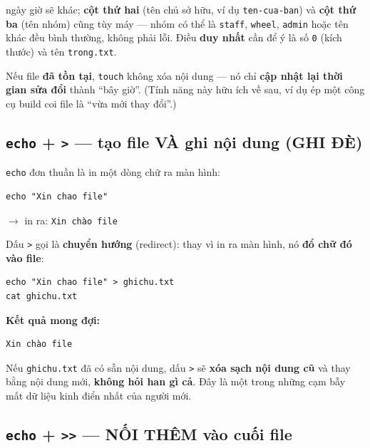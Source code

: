 \documentclass[12pt,a4paper]{article}
\newcommand{\cmd}[1]{\texttt{#1}}
\begin{document}
\begin{notebox}[title={Ghi chú: Máy bạn có thể hiển thị khác}]
ngày giờ sẽ khác; \textbf{cột thứ hai} (tên chủ sở hữu, ví dụ \cmd{ten-cua-ban}) và \textbf{cột thứ ba} (tên nhóm) cũng tùy máy --- nhóm có thể là \cmd{staff}, \cmd{wheel}, \cmd{admin} hoặc tên khác đều bình thường, không phải lỗi. Điều \textbf{duy nhất} cần để ý là số \cmd{0} (kích thước) và tên \cmd{trong.txt}.
\end{notebox}

Nếu file \textbf{đã tồn tại}, \cmd{touch} không xóa nội dung --- nó chỉ \textbf{cập nhật lại thời gian sửa đổi} thành ``bây giờ''. (Tính năng này hữu ích về sau, ví dụ ép một công cụ build coi file là ``vừa mới thay đổi''.)

\subsection{\texttt{echo} + \texttt{>} --- tạo file VÀ ghi nội dung (GHI ĐÈ)}

\cmd{echo} đơn thuần là in một dòng chữ ra màn hình:

\begin{Verbatim}
echo "Xin chao file"
\end{Verbatim}
$\rightarrow$ in ra: \cmd{Xin chào file}

Dấu \cmd{>} gọi là \textbf{chuyển hướng} (redirect): thay vì in ra màn hình, nó \textbf{đổ chữ đó vào file}:

\begin{Verbatim}
echo "Xin chao file" > ghichu.txt
cat ghichu.txt
\end{Verbatim}

\textbf{Kết quả mong đợi:}
\begin{Verbatim}
Xin chào file
\end{Verbatim}

\begin{dangerbox}[title={CỰC KỲ QUAN TRỌNG --- \texttt{>} luôn GHI ĐÈ}]
Nếu \cmd{ghichu.txt} đã có sẵn nội dung, dấu \cmd{>} sẽ \textbf{xóa sạch nội dung cũ} và thay bằng nội dung mới, \textbf{không hỏi han gì cả}. Đây là một trong những cạm bẫy mất dữ liệu kinh điển nhất của người mới.
\end{dangerbox}

\subsection{\texttt{echo} + \texttt{>>} --- NỐI THÊM vào cuối file}
\end{document}
